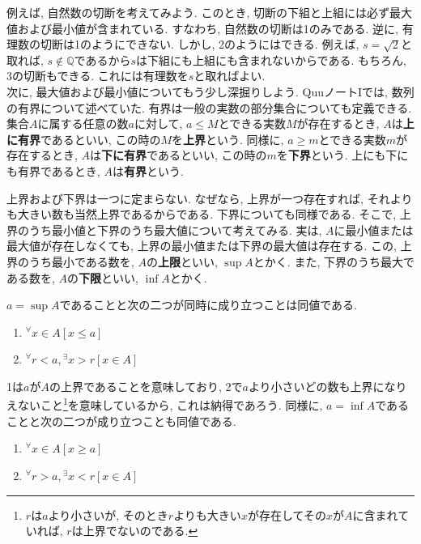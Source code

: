 \documentclass[a4j,dvipdfmx]{jsarticle}
\numberwithin{equation}{section}
\begin{document}
            例えば, 自然数の切断を考えてみよう. このとき, 切断の下組と上組には必ず最大値および最小値が含まれている. すなわち, 自然数の切断は1のみである.
            逆に, 有理数の切断は1のようにできない. しかし, 2のようにはできる. 例えば, $s=\sqrt{2}$と取れば, $s\not\in \mathbb{Q}$であるから$s$は下組にも上組にも含まれないからである.
            もちろん, 3の切断もできる. これには有理数を$s$と取ればよい.\\

            次に, 最大値および最小値についてもう少し深掘りしよう. QuuノートIでは, 数列の有界について述べていた. 有界は一般の実数の部分集合についても定義できる.
            集合$A$に属する任意の数$a$に対して, $a\leq M$とできる実数$M$が存在するとき, $A$は\textbf{上に有界}であるといい, この時の$M$を\textbf{上界}という.
            同様に, $a\geq m$とできる実数$m$が存在するとき, $A$は\textbf{下に有界}であるといい, この時の$m$を\textbf{下界}という.
            上にも下にも有界であるとき, $A$は\textbf{有界}という.

            上界および下界は一つに定まらない. なぜなら, 上界が一つ存在すれば, それよりも大きい数も当然上界であるからである. 下界についても同様である.
            そこで, 上界のうち最小値と下界のうち最大値について考えてみる. 実は, $A$に最小値または最大値が存在しなくても, 上界の最小値または下界の最大値は存在する.
            この, 上界のうち最小である数を, $A$の\textbf{上限}といい, $\sup A$とかく. また, 下界のうち最大である数を, $A$の\textbf{下限}といい, $\inf A$とかく.

            $a=\sup A$であることと次の二つが同時に成り立つことは同値である.
            \begin{enumerate}
                \item $^\forall x\in A \left[x\leq a\right]$
                \item $^\forall r<a,{}^\exists x> r\left[x\in A\right]$
            \end{enumerate}
            1は$a$が$A$の上界であることを意味しており, 2で$a$より小さいどの数も上界になりえないこと\footnote{$r$は$a$より小さいが, そのとき$r$よりも大きい$x$が存在してその$x$が$A$に含まれていれば, $r$は上界でないのである.}を意味しているから, これは納得であろう.
            同様に, $a=\inf A$であることと次の二つが成り立つことも同値である.
            \begin{enumerate}
                \item $^\forall x\in A \left[x\geq a\right]$
                \item $^\forall r>a,{}^\exists x< r\left[x\in A\right]$
            \end{enumerate}
\end{document}
